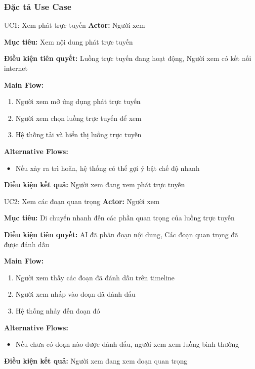 \documentclass[12pt,a4paper]{article}
\newcommand{\usecasefield}[2]{%
    \textbf{#1:} #2 \par\vspace{2pt}
}
\newenvironment{mainflow}{
    \par\vspace{4pt}
    \textbf{Main Flow:}
    \begin{enumerate}[leftmargin=*, label=\arabic*., itemsep=2pt]
}{
    \end{enumerate}
}
\newenvironment{altflow}{
    \par\vspace{4pt}
    \textbf{Alternative Flows:}
    \begin{itemize}[leftmargin=*, label=\textendash, itemsep=2pt]
}{
    \end{itemize}
}
\begin{document}
\subsubsection{Đặc tả Use Case}

\begin{usecase}{UC1: Xem phát trực tuyến}
    \usecasefield{Actor}{Người xem}
    \usecasefield{Mục tiêu}{Xem nội dung phát trực tuyến}
    \usecasefield{Điều kiện tiên quyết}{Luồng trực tuyến đang hoạt động, Người xem có kết nối internet}
    \begin{mainflow}
        \item Người xem mở ứng dụng phát trực tuyến
        \item Người xem chọn luồng trực tuyến để xem
        \item Hệ thống tải và hiển thị luồng trực tuyến
    \end{mainflow}
    \begin{altflow}
        \item Nếu xảy ra trì hoãn, hệ thống có thể gợi ý bật chế độ nhanh
    \end{altflow}
    \usecasefield{Điều kiện kết quả}{Người xem đang xem phát trực tuyến}
\end{usecase}

\begin{usecase}{UC2: Xem các đoạn quan trọng}
    \usecasefield{Actor}{Người xem}
    \usecasefield{Mục tiêu}{Di chuyển nhanh đến các phần quan trọng của luồng trực tuyến}
    \usecasefield{Điều kiện tiên quyết}{AI đã phân đoạn nội dung, Các đoạn quan trọng đã được đánh dấu}
    \begin{mainflow}
        \item Người xem thấy các đoạn đã đánh dấu trên timeline
        \item Người xem nhấp vào đoạn đã đánh dấu
        \item Hệ thống nhảy đến đoạn đó
    \end{mainflow}
    \begin{altflow}
        \item Nếu chưa có đoạn nào được đánh dấu, người xem xem luồng bình thường
    \end{altflow}
    \usecasefield{Điều kiện kết quả}{Người xem đang xem đoạn quan trọng}
\end{usecase}
\end{document}
